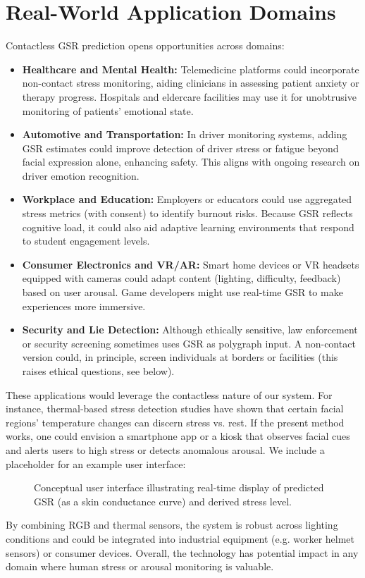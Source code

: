 \documentclass[12pt]{article}
\begin{document}
    \section{Real-World Application Domains}
    Contactless GSR prediction opens opportunities across domains:
    \begin{itemize}
        \item \textbf{Healthcare and Mental Health:} Telemedicine platforms could incorporate non-contact stress monitoring, aiding clinicians in assessing patient anxiety or therapy progress. Hospitals and eldercare facilities may use it for unobtrusive monitoring of patients' emotional state.
        \item \textbf{Automotive and Transportation:} In driver monitoring systems, adding GSR estimates could improve detection of driver stress or fatigue beyond facial expression alone, enhancing safety. This aligns with ongoing research on driver emotion recognition.
        \item \textbf{Workplace and Education:} Employers or educators could use aggregated stress metrics (with consent) to identify burnout risks. Because GSR reflects cognitive load, it could also aid adaptive learning environments that respond to student engagement levels.
        \item \textbf{Consumer Electronics and VR/AR:} Smart home devices or VR headsets equipped with cameras could adapt content (lighting, difficulty, feedback) based on user arousal. Game developers might use real-time GSR to make experiences more immersive.
        \item \textbf{Security and Lie Detection:} Although ethically sensitive, law enforcement or security screening sometimes uses GSR as polygraph input. A non-contact version could, in principle, screen individuals at borders or facilities (this raises ethical questions, see below).
    \end{itemize}
    These applications would leverage the contactless nature of our system. For instance, thermal-based stress detection studies have shown that certain facial regions' temperature changes can discern stress vs. rest. If the present method works, one could envision a smartphone app or a kiosk that observes facial cues and alerts users to high stress or detects anomalous arousal. We include a placeholder for an example user interface:
    \begin{figure}[ht]
        \centering
        \caption{Conceptual user interface illustrating real-time display of predicted GSR (as a skin conductance curve) and derived stress level.}
        \label{fig:ui}
    \end{figure}
    By combining RGB and thermal sensors, the system is robust across lighting conditions and could be integrated into industrial equipment (e.g. worker helmet sensors) or consumer devices. Overall, the technology has potential impact in any domain where human stress or arousal monitoring is valuable.
\end{document}
